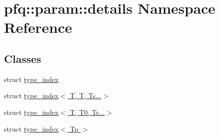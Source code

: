 \hypertarget{namespacepfq_1_1param_1_1details}{\section{pfq\+:\+:param\+:\+:details Namespace Reference}
\label{namespacepfq_1_1param_1_1details}
}
\subsection*{Classes}
\begin{DoxyCompactItemize}
\item 
struct \hyperlink{structpfq_1_1param_1_1details_1_1type__index}{type\+\_\+index}
\item 
struct \hyperlink{structpfq_1_1param_1_1details_1_1type__index_3_01T_00_01T_00_01Ts_8_8_8_4}{type\+\_\+index$<$ T, T, Ts...$>$}
\item 
struct \hyperlink{structpfq_1_1param_1_1details_1_1type__index_3_01T_00_01T0_00_01Ts_8_8_8_4}{type\+\_\+index$<$ T, T0, Ts...$>$}
\item 
struct \hyperlink{structpfq_1_1param_1_1details_1_1type__index_3_01Tp_01_4}{type\+\_\+index$<$ Tp $>$}
\end{DoxyCompactItemize}
